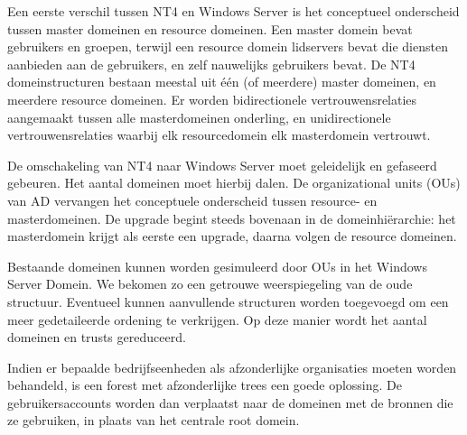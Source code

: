 Een eerste verschil tussen NT4 en Windows Server is het conceptueel onderscheid
tussen master domeinen en resource domeinen. Een master domein bevat gebruikers
en groepen, terwijl een resource domein lidservers bevat die diensten aanbieden
aan de gebruikers, en zelf nauwelijks gebruikers bevat. De NT4 domeinstructuren
bestaan meestal uit één (of meerdere) master domeinen, en meerdere resource
domeinen. Er worden bidirectionele vertrouwensrelaties aangemaakt tussen alle
masterdomeinen onderling, en unidirectionele vertrouwensrelaties waarbij elk
resourcedomein elk masterdomein vertrouwt.

De omschakeling van NT4 naar Windows Server moet geleidelijk en gefaseerd
gebeuren. Het aantal domeinen moet hierbij dalen. De organizational units (OUs)
van AD vervangen het conceptuele onderscheid tussen resource- en masterdomeinen.
De upgrade begint steeds bovenaan in de domeinhiërarchie: het masterdomein
krijgt als eerste een upgrade, daarna volgen de resource domeinen.

Bestaande domeinen kunnen worden gesimuleerd door OUs in het Windows Server
Domein. We bekomen zo een getrouwe weerspiegeling van de oude structuur.
Eventueel kunnen aanvullende structuren worden toegevoegd om een meer
gedetaileerde ordening te verkrijgen. Op deze manier wordt het aantal domeinen
en trusts gereduceerd.

Indien er bepaalde bedrijfseenheden als afzonderlijke organisaties moeten worden
behandeld, is een forest met afzonderlijke trees een goede oplossing. De
gebruikersaccounts worden dan verplaatst naar de domeinen met de bronnen die ze
gebruiken, in plaats van het centrale root domein.

